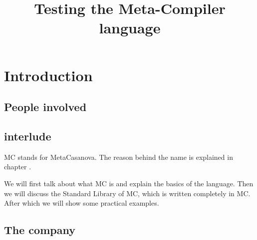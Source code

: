 


\title{Testing the Meta-Compiler language}
\author{\writer}






\part{Introduction}

\chapter{People involved}

\chapter{interlude}
MC stands for MetaCasanova. The reason behind the name is explained in chapter .

We will first talk about what MC is and explain the basics of the language.
Then we will discuss the Standard Library of MC, which is written completely in MC.
After which we will show some practical examples.

\chapter{The company}


